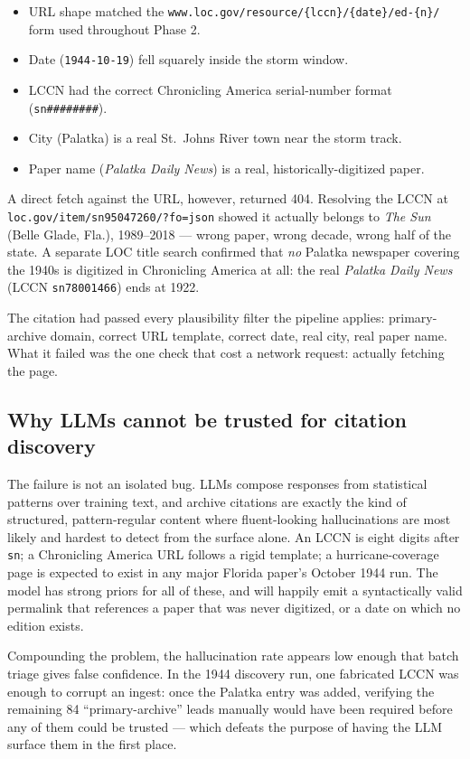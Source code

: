 \documentclass[11pt,letterpaper]{article}
\begin{document}
\begin{itemize}[leftmargin=1.5em]
  \item URL shape matched the \texttt{www.loc.gov/resource/\{lccn\}/\{date\}/ed-\{n\}/} form used throughout Phase 2.
  \item Date (\texttt{1944-10-19}) fell squarely inside the storm window.
  \item LCCN had the correct Chronicling America serial-number format (\texttt{sn\#\#\#\#\#\#\#\#}).
  \item City (Palatka) is a real St.\ Johns River town near the storm track.
  \item Paper name (\emph{Palatka Daily News}) is a real, historically-digitized paper.
\end{itemize}

A direct fetch against the URL, however, returned 404. Resolving the LCCN at \texttt{loc.gov/item/sn95047260/?fo=json} showed it actually belongs to \emph{The Sun} (Belle Glade, Fla.), 1989--2018 --- wrong paper, wrong decade, wrong half of the state. A separate LOC title search confirmed that \emph{no} Palatka newspaper covering the 1940s is digitized in Chronicling America at all: the real \emph{Palatka Daily News} (LCCN \texttt{sn78001466}) ends at 1922.

The citation had passed every plausibility filter the pipeline applies: primary-archive domain, correct URL template, correct date, real city, real paper name. What it failed was the one check that cost a network request: actually fetching the page.

\subsection{Why LLMs cannot be trusted for citation discovery}

The failure is not an isolated bug. LLMs compose responses from statistical patterns over training text, and archive citations are exactly the kind of structured, pattern-regular content where fluent-looking hallucinations are most likely and hardest to detect from the surface alone. An LCCN is eight digits after \texttt{sn}; a Chronicling America URL follows a rigid template; a hurricane-coverage page is expected to exist in any major Florida paper's October 1944 run. The model has strong priors for all of these, and will happily emit a syntactically valid permalink that references a paper that was never digitized, or a date on which no edition exists.

Compounding the problem, the hallucination rate appears low enough that batch triage gives false confidence. In the 1944 discovery run, one fabricated LCCN was enough to corrupt an ingest: once the Palatka entry was added, verifying the remaining 84 ``primary-archive'' leads manually would have been required before any of them could be trusted --- which defeats the purpose of having the LLM surface them in the first place.
\end{document}
